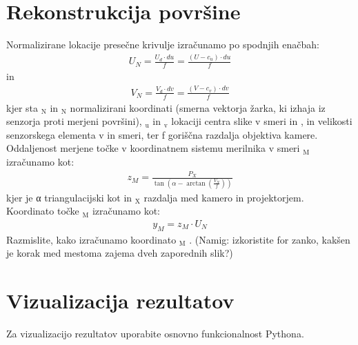\documentclass[letterpaper,10pt,english]{sphinxmanual}
\begin{document}
\section{Rekonstrukcija površine}
\label{\detokenize{laserskiprofilomer:rekonstrukcija-povrsine}}
\sphinxAtStartPar
Normalizirane lokacije presečne krivulje izračunamo po spodnjih enačbah:
\begin{equation*}
\begin{split}U_N = \frac{U_d \cdot du}{f} =  \frac{(U - c_u) \cdot du}{f}\end{split}
\end{equation*}
\sphinxAtStartPar
in
\begin{equation*}
\begin{split}V_N = \frac{V_d \cdot dv}{f} =  \frac{(V - c_v) \cdot dv}{f}\end{split}
\end{equation*}
\sphinxAtStartPar
kjer sta $_{\text{N}}$ in $_{\text{N}}$ normalizirani koordinati (smerna vektorja žarka, ki izhaja iz senzorja proti merjeni površini), $_{\text{u}}$ in $_{\text{v}}$ lokaciji centra slike v smeri  in ,  in  velikosti senzorskega elementa v  in  smeri, ter f goriščna razdalja objektiva kamere.
Oddaljenost merjene točke v koordinatnem sistemu merilnika v  smeri $_{\text{M}}$ izračunamo kot:
\begin{equation*}
\begin{split}z_M = \frac{P_X}{\tan(\alpha - \arctan(\frac{V_N}{f}))}\end{split}
\end{equation*}
\sphinxAtStartPar
kjer je α triangulacijski kot in $_{\text{X}}$ razdalja med kamero in projektorjem.
Koordinato točke $_{\text{M}}$ izračunamo kot:
\begin{equation*}
\begin{split}y_M = z_M \cdot U_N\end{split}
\end{equation*}
\sphinxAtStartPar
Razmislite, kako izračunamo koordinato $_{\text{M}}$ . (Namig: izkoristite for zanko, kakšen je korak med
mestoma zajema dveh zaporednih slik?)


\section{Vizualizacija rezultatov}
\label{\detokenize{laserskiprofilomer:vizualizacija-rezultatov}}
\sphinxAtStartPar
Za vizualizacijo rezultatov uporabite osnovno funkcionalnost Pythona.
\end{document}
